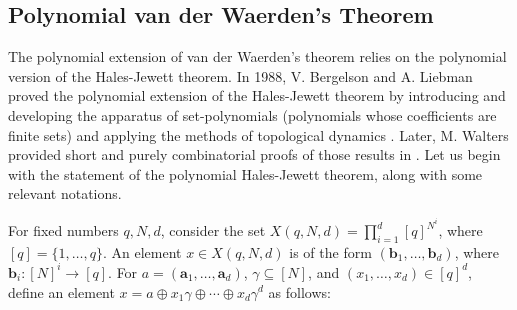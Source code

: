\documentclass[12pt]{amsart}
\theoremstyle{plain}
\theoremstyle{definition}
\theoremstyle{remark}
\numberwithin{equation}{section}
\newcommand{\Dom}{\mathrm{Dom}}
\newcommand{\card}{\mathrm{card}}
\begin{document}









\subsection{Polynomial van der Waerden's Theorem}
The polynomial extension of van der Waerden's theorem relies on the polynomial version of the Hales-Jewett theorem. In 1988, V. Bergelson and A. Liebman proved the polynomial extension of the Hales-Jewett theorem by introducing and developing the apparatus of set-polynomials (polynomials whose coefficients are finite sets) and applying the methods of topological dynamics \cite{BerLeib89}. Later, M. Walters provided short and purely combinatorial proofs of those results in \cite{Walters2000}. Let us begin with the statement of the polynomial Hales-Jewett theorem, along with some relevant notations.

For fixed numbers \( q, N, d \), consider the set \( X(q, N, d) = \prod_{i=1}^d [q]^{N^i} \), where \( [q] = \{1, \dots, q\} \). An element \( x \in X(q, N, d) \) is of the form \( (\mathbf{b}_1, \dots, \mathbf{b}_d) \), where \( \mathbf{b}_i : [N]^i \to [q] \). For \( a = (\mathbf{a}_1, \dots, \mathbf{a}_d) \), \( \gamma \subseteq [N] \), and \( (x_1, \dots, x_d) \in [q]^d \), define an element \( x = a \oplus x_1 \gamma \oplus \cdots \oplus x_d \gamma^d \) as follows:
\end{document}
